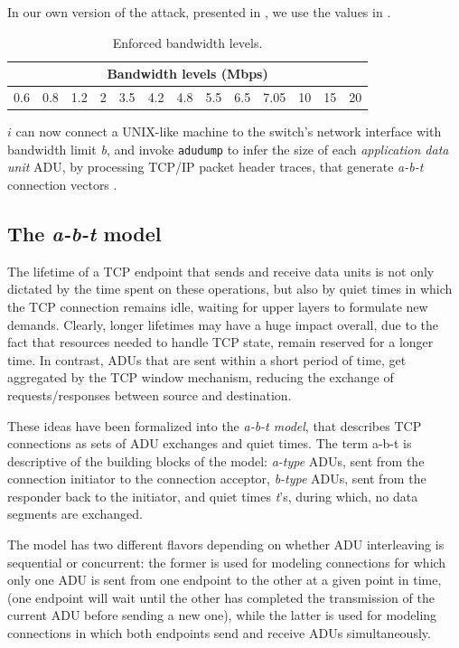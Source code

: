 In our own version of the attack, presented in , we use
the values in . 

\begin{table}[htb]
  \centering
  \begin{tabular}{|c|c|c|c|c|c|c|c|c|c|c|c|c|}
    \hline
    \multicolumn{13}{|c|}{\textbf{Bandwidth levels (Mbps)}} \\
    \hline
    0.6 & 0.8 & 1.2 & 2 & 3.5 & 4.2 & 4.8 & 5.5 & 6.5 & 7.05 & 10 & 15 & 20 \\ 
    \hline
  \end{tabular}
  \caption{Enforced bandwidth levels.}
  \label{tab:bandwidths}
\end{table}

$i$ can now connect a UNIX-like machine to the switch's network interface
with bandwidth limit \emph{b}, and invoke \texttt{adudump} to infer the size of
each \emph{application data unit} ADU, by processing TCP/IP packet header
traces, that generate \emph{a-b-t} connection vectors \cite{hernandez}.

\subsection{The \emph{a-b-t} model}

The lifetime of a TCP endpoint that sends and receive data units is not only
dictated by the time spent on these operations, but also by quiet times in
which the TCP connection remains idle, waiting for upper layers to formulate
new demands. Clearly, longer lifetimes may have a huge impact overall, due to
the fact that resources needed to handle TCP state, remain reserved for a
longer time. In contrast, ADUs that are sent within a short period of time, get
aggregated by the TCP window mechanism, reducing the exchange of
requests/responses between source and destination.

These ideas have been formalized into the \emph{a-b-t model}, that describes
TCP connections as sets of ADU exchanges and quiet times. The term a-b-t is
descriptive of the building blocks of the model: \emph{a-type} ADUs, sent from
the connection initiator to the connection acceptor, \emph{b-type} ADUs, sent
from the responder back to the initiator, and quiet times \emph{t}'s, during
which, no data segments are exchanged.

The model has two different flavors depending on whether ADU interleaving is
sequential or concurrent: the former is used for modeling connections for which
only one ADU is sent from one endpoint to the other at a given point in time,
(one endpoint will wait until the other has completed the transmission of the
current ADU before sending a new one), while the latter is used for modeling
connections in which both endpoints send and receive ADUs simultaneously.

